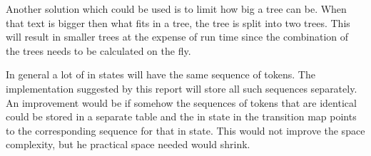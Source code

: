Another solution which could be used is to limit how big a tree can be. When
that text is bigger then what fits in a tree, the tree is split into two trees.
This will result in smaller trees at the expense of run time since the
combination of the trees needs to be calculated on the fly.

In general a lot of in states will have the same sequence of tokens. The
implementation suggested by this report will store all such sequences
separately. An improvement would be if somehow the sequences of tokens that are
identical could be stored in a separate table and the in state in the transition
map points to the corresponding sequence for that in state. This would not
improve the space complexity, but he practical space needed would shrink.
